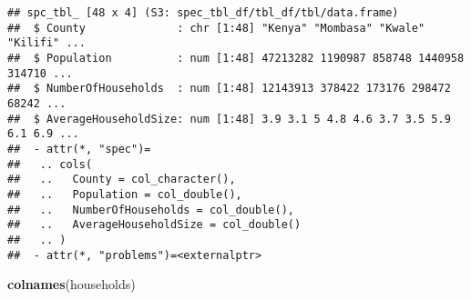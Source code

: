 \documentclass[
]{article}
\newenvironment{Shaded}{\begin{snugshade}}{\end{snugshade}}
\newcommand{\AttributeTok}[1]{\textcolor[rgb]{0.13,0.29,0.53}{#1}}
\newcommand{\CommentTok}[1]{\textcolor[rgb]{0.56,0.35,0.01}{\textit{#1}}}
\newcommand{\FunctionTok}[1]{\textcolor[rgb]{0.13,0.29,0.53}{\textbf{#1}}}
\newcommand{\NormalTok}[1]{#1}
\newcommand{\OtherTok}[1]{\textcolor[rgb]{0.56,0.35,0.01}{#1}}
\newcommand{\SpecialCharTok}[1]{\textcolor[rgb]{0.81,0.36,0.00}{\textbf{#1}}}
\newcommand{\StringTok}[1]{\textcolor[rgb]{0.31,0.60,0.02}{#1}}
\begin{document}
\begin{Shaded}
\end{Shaded}

\begin{verbatim}
## spc_tbl_ [48 x 4] (S3: spec_tbl_df/tbl_df/tbl/data.frame)
##  $ County              : chr [1:48] "Kenya" "Mombasa" "Kwale" "Kilifi" ...
##  $ Population          : num [1:48] 47213282 1190987 858748 1440958 314710 ...
##  $ NumberOfHouseholds  : num [1:48] 12143913 378422 173176 298472 68242 ...
##  $ AverageHouseholdSize: num [1:48] 3.9 3.1 5 4.8 4.6 3.7 3.5 5.9 6.1 6.9 ...
##  - attr(*, "spec")=
##   .. cols(
##   ..   County = col_character(),
##   ..   Population = col_double(),
##   ..   NumberOfHouseholds = col_double(),
##   ..   AverageHouseholdSize = col_double()
##   .. )
##  - attr(*, "problems")=<externalptr>
\end{verbatim}

\begin{Shaded}
\begin{Highlighting}[]
\FunctionTok{colnames}\NormalTok{(households)}
\end{Highlighting}
\end{Shaded}
\end{document}
